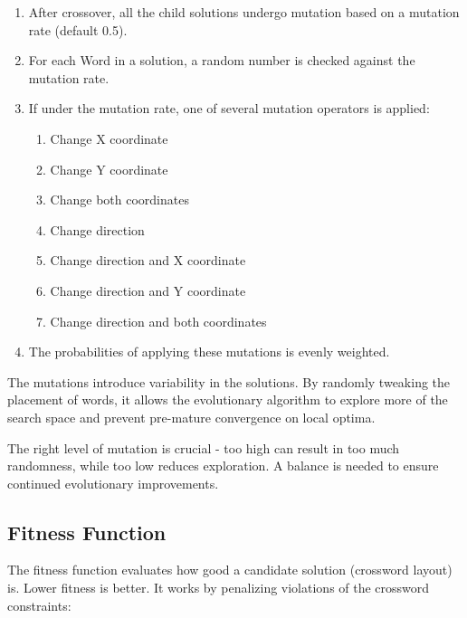\documentclass{article}
\begin{document}
\begin{enumerate}
		\item After crossover, all the child solutions undergo mutation based on a mutation rate (default 0.5).
		\item For each Word in a solution, a random number is checked against the mutation rate.
		\item If under the mutation rate, one of several mutation operators is applied:
			\begin{enumerate}
					\item Change X coordinate
					\item Change Y coordinate
					\item Change both coordinates
					\item Change direction
					\item Change direction and X coordinate
					\item Change direction and Y coordinate
					\item Change direction and both coordinates
			\end{enumerate}
		\item The probabilities of applying these mutations is evenly weighted.

\end{enumerate}
	The mutations introduce variability in the solutions. By randomly tweaking the placement of words, it allows the evolutionary algorithm to explore more of the search space and prevent pre-mature convergence on local optima.

The right level of mutation is crucial - too high can result in too much randomness, while too low reduces exploration. A balance is needed to ensure continued evolutionary improvements.

\subsection*{Fitness Function}
The fitness function evaluates how good a candidate solution (crossword layout) is. Lower fitness is better. It works by penalizing violations of the crossword constraints:
\end{document}
